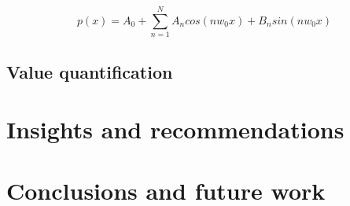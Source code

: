 \documentclass[article]{proc}
\begin{document}
\begin{equation}
p(x) = A_0 + \sum_{n=1}^{N} A_ncos(nw_0x) + B_nsin(nw_0x)
\label{eq:fourier_poly}
\end{equation}

\subsection{Value quantification}




\section{Insights and recommendations}


\section{Conclusions and future work}





\scriptsize{

}
\end{document}
